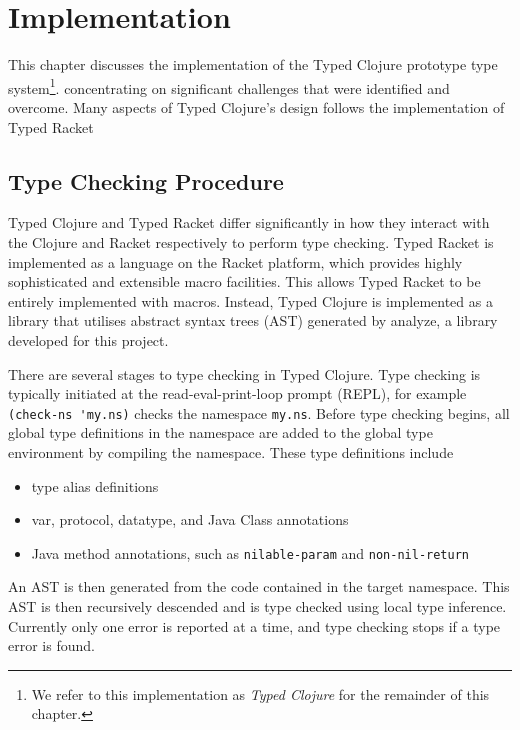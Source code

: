 \chapter{Implementation}

This chapter discusses the implementation of the Typed Clojure prototype type 
system\footnote{We refer to this implementation as \emph{Typed Clojure} for the remainder of this chapter.}.
concentrating on significant challenges that were identified and overcome.
Many aspects of Typed Clojure's design follows the implementation of Typed Racket

\section{Type Checking Procedure}

Typed Clojure and Typed Racket differ significantly in how they interact with
the Clojure and Racket respectively to perform type checking.
Typed Racket is implemented as a language on the
Racket platform, which provides highly sophisticated and extensible macro facilities.
This allows Typed Racket to be entirely implemented with macros.
Instead, Typed Clojure is implemented as a library that utilises abstract syntax trees (AST)
generated by analyze, a library developed for this project.

There are several stages to type checking in Typed Clojure.
Type checking is typically initiated at the read-eval-print-loop prompt (REPL),
for example \lstinline|(check-ns 'my.ns)| checks the namespace \lstinline|my.ns|.
Before type checking begins, all global type definitions in the namespace
are added to the global type environment by compiling the namespace.
These type definitions include

\begin{itemize}
  \item type alias definitions
  \item var, protocol, datatype, and Java Class annotations
  \item Java method annotations, such as \lstinline|nilable-param| and \lstinline|non-nil-return|
\end{itemize}

An AST is then generated from the code contained in the target namespace.
This AST is then recursively descended and is type checked using local type inference.
Currently only one error is reported at a time, and type checking stops if a type error
is found.


